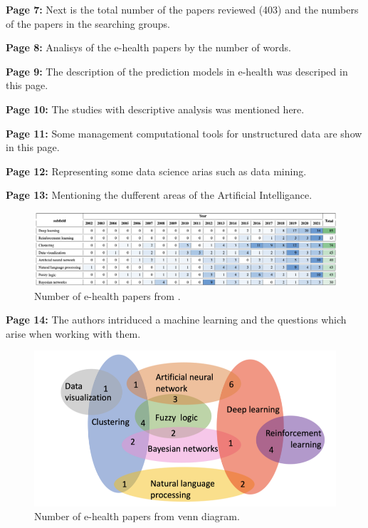     \textbf{Page 7:}
    Next is the total number of the papers reviewed (403) and the numbers of the papers in the searching groups.
    
    \textbf{Page 8:}
    Analisys of the e-health papers by the number of words.
    
    \textbf{Page 9:}
    The description of the prediction models in e-health was descriped in this page.
    
    \textbf{Page 10:}
    The studies with descriptive analysis was mentioned here.
    
    \textbf{Page 11:}
    Some management computational tools for unstructured data are show in this page.
    
    \textbf{Page 12:}
    Representing some data science arias such as data mining.
    
    \textbf{Page 13:}
    Mentioning the dufferent areas of the Artificial Intelligance.
    \begin{figure}[H]
        \centering
        \includegraphics[width=1\textwidth]{figures/SR0008ES23/fig2.png}
        \caption{Number of e-health papers from \cite{x249}.}
        \label{fig2:SR0008ES23}
    \end{figure}

    \textbf{Page 14:}
    The authors intriduced a machine learning and the questions which arise when working with them.
    \begin{figure}[H]
        \centering
        \includegraphics[width=.8\textwidth]{figures/SR0008ES23/fig3.png}
        \caption{Number of e-health papers from \cite{x249} venn diagram.}
        \label{fig3:SR0008ES23}
    \end{figure}
    
